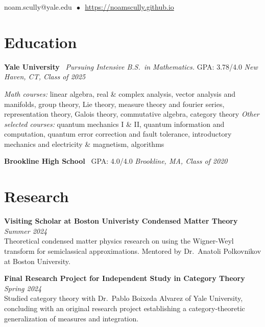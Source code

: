 \documentclass[11pt]{article}
\newcommand{\entry}[3]{
    \vspace{-.58em}
    \textbf{#1} \hfill \textit{#2} \\
    #3 \vspace{0.5em}}
\begin{document}
\begin{center}

  
  \vspace{-.1em}
  \hspace{1.8em}
  noam.scully@yale.edu $\, \bullet \,$ \href{https://noamscully.github.io}{https://noamscully.github.io}

\end{center}

\section*{Education}
\vspace{-0.1em}

\textbf{Yale University} \ \textit{Pursuing Intensive B.S.\ in Mathematics.} GPA: 3.78/4.0 \hfill \textit{New Haven, CT, Class of 2025}

\vspace{-.6mm}
\textit{Math courses:} linear algebra, real \& complex analysis, vector analysis and manifolds, group theory, Lie theory, measure theory and fourier series, representation theory, Galois theory, commutative algebra, category theory
\newline \vspace{-3.6mm} \newline
\textit{Other selected courses:} quantum mechanics I \& II, quantum information and computation, quantum error correction and fault tolerance, introductory mechanics and electricity \& magnetism, algorithms

\vspace{-.4mm}
\vspace{.1em}
\textbf{Brookline High School} \ GPA: 4.0/4.0 \hfill \textit{Brookline, MA, Class of 2020}
\vspace{.4em}


\section*{Research}
\vspace{.58em}
\vspace{-0.1em}

\entry{Visiting Scholar at Boston Univeristy Condensed Matter Theory}{Summer 2024}{
  Theoretical condensed matter physics research on using the Wigner-Weyl transform for semiclassical approximations. Mentored by Dr.\ Anatoli Polkovnikov at Boston University.
}

\entry{Final Research Project for Independent Study in Category Theory}{Spring 2024}{
	Studied category theory with Dr.\ Pablo Boixeda Alvarez of Yale University, concluding with an original research project establishing a category-theoretic generalization of measures and integration. %
}
\end{document}
